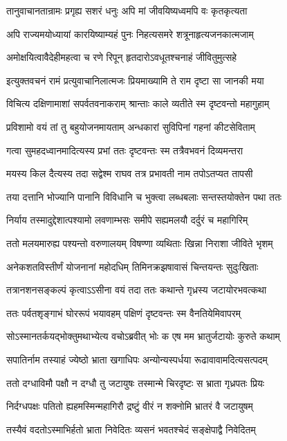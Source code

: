 \twolineshloka
{तानुवाचानतान्रामः प्रगृह्य सशरं धनुः}
{अपि मां जीवयिष्यध्वमपि वः कृतकृत्यता}


\twolineshloka
{अपि राज्यमयोध्यायां कारयिष्याम्यहं पुनः}
{निहत्यसमरे शत्रूनाहृत्यजनकात्मजाम्}


\twolineshloka
{अमोक्षयित्वावैदेहीमहत्वा च रणे रिपून्}
{हृतदारोऽवधूतश्चनाहं जीवितुमुत्सहे}


\twolineshloka
{इत्युक्तवचनं रामं प्रत्युवाचानिलात्मजः}
{प्रियमाख्यामि ते राम दृष्टा सा जानकी मया}


\twolineshloka
{विचित्य दक्षिणामाशां सपर्वतवनाकराम्}
{श्रान्ताः काले व्यतीते स्म दृष्टवन्तो महागुहाम्}


\twolineshloka
{प्रविशामो वयं तां तु बहुयोजनमायताम्}
{अन्धकारां सुविपिनां गहनां कीटसेविताम्}


\twolineshloka
{गत्वा सुमहदध्वानमादित्यस्य प्रभां ततः}
{दृष्टवन्तः स्म तत्रैवभवनं दिव्यमन्तरा}


\twolineshloka
{मयस्य किल दैत्यस्य तदा सद्वेश्म राघव}
{तत्र प्रभावती नाम तपोऽतप्यत तापसी}


\twolineshloka
{तया दत्तानि भोज्यानि पानानि विविधानि च}
{भुक्त्वा लब्धबलाः सन्तस्तयोक्तेन पथा ततः}


\twolineshloka
{निर्याय तस्मादुद्देशात्पश्यामो लवणाम्भसः}
{समीपे सह्यमलयौ दर्दुरं च महागिरिम्}


\twolineshloka
{ततो मलयमारुह्य पश्यन्तो वरुणालयम्}
{विषण्णा व्यथिताः खिन्ना निराशा जीविते भृशम्}


\twolineshloka
{अनेकशतविस्तीर्णं योजनानां महोदधिम्}
{तिमिनक्रझषावासं चिन्तयन्तः सुदुःखिताः}


\twolineshloka
{तत्रानशनसङ्कल्पं कृत्वाऽऽसीना वयं तदा}
{ततः कथान्ते गृध्रस्य जटायोरभवत्कथा}


\twolineshloka
{ततः पर्वतशृङ्गाभं घोररूपं भयावहम्}
{पक्षिणं दृष्टवन्तः स्म वैनतियेमिवापरम्}


\twolineshloka
{सोऽस्मानतर्कयद्भोक्तुमथाभ्येत्य वचोऽब्रवीत्}
{भोः क एष मम भ्रातुर्जटायोः कुरुते कथाम्}


\twolineshloka
{सपातिर्नाम तस्याहं ज्येष्ठो भ्राता खगाधिपः}
{अन्योन्यस्पर्धया रूढावावामदित्यसत्पदम्}


\twolineshloka
{ततो दग्धाविमौ पक्षौ न दग्धौ तु जटायुषः}
{तस्मान्मे चिरदृष्टः स भ्राता गृध्रपतः प्रियः}


\twolineshloka
{निर्दग्धपक्षः पतितो ह्यहमस्मिन्महागिरौ}
{द्रष्टुं वीरं न शक्नोमि भ्रातरं वै जटायुषम्}


\twolineshloka
{तस्यैवं वदतोऽस्माभिर्हतो भ्राता निवेदितः}
{व्यसनं भवतश्चेदं सङ्क्षेपाद्वै निवेदितम्}


